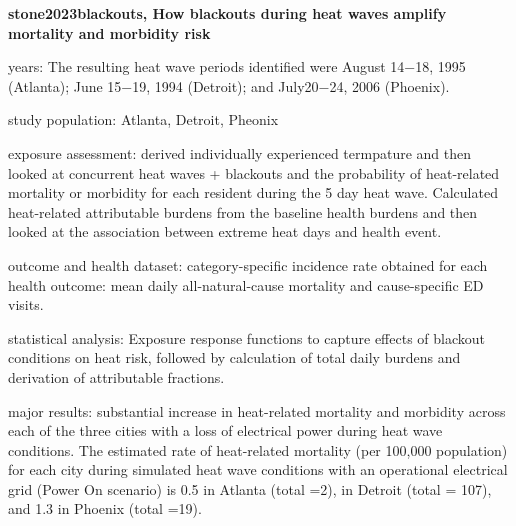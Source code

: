 \textbf{stone2023blackouts, How blackouts during heat waves amplify mortality and morbidity risk}
    \item years: The resulting heat wave periods identified were August 14−18, 1995 (Atlanta); June 15−19, 1994 (Detroit); and July20−24, 2006 (Phoenix).
    \item study population: Atlanta, Detroit, Pheonix 
    \item exposure assessment: derived individually experienced termpature and then looked at concurrent heat waves + blackouts and the probability of heat-related mortality or morbidity for each resident during the 5 day heat wave. Calculated heat-related attributable burdens from the baseline health burdens and then looked at the association between extreme heat days and health event. 
    \item outcome and health dataset: category-specific incidence rate obtained for each health outcome: mean daily all-natural-cause mortality and cause-specific ED visits.
    \item statistical analysis: Exposure response functions to capture effects of blackout conditions on heat risk, followed by calculation of total daily burdens and derivation of attributable fractions. 
    \item major results: substantial increase in heat-related mortality and morbidity across each of the three cities with a loss of electrical power during heat wave conditions. The estimated rate of heat-related mortality (per 100,000 population) for each city during simulated heat wave conditions with an operational electrical grid (Power On scenario) is 0.5 in Atlanta (total =2), in Detroit (total = 107), and 1.3 in Phoenix (total =19). 
